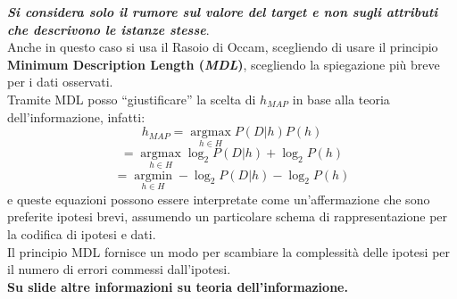 \documentclass[a4paper,12pt, oneside]{book}
\begin{document}
\textbf{\textit{Si considera solo il rumore sul valore del target e non sugli
    attributi che descrivono le istanze stesse}}.\\
Anche in questo caso si usa il Rasoio di Occam, scegliendo di usare il principio
\textbf{Minimum Description Length (\textit{MDL})}, scegliendo la spiegazione
più breve per i dati osservati.\\
Tramite MDL posso ``giustificare'' la scelta di $h_{MAP}$ in base alla teoria
dell'informazione, infatti:
\[h_{MAP}=\operatorname*{argmax}_{h\in H}P(D|h)P(h)\]
\[=\operatorname*{argmax}_{h\in H}\log_2P(D|h)+\log_2P(h)\]
\[=\operatorname*{argmin}_{h\in H}-\log_2P(D|h)-\log_2P(h)\]
e queste equazioni possono essere interpretate come un'affermazione che sono
preferite ipotesi brevi, assumendo un particolare schema di rappresentazione per
la codifica di ipotesi e dati.\\
Il principio MDL fornisce un modo per scambiare la complessità delle ipotesi
per il numero di errori commessi dall'ipotesi.\\

\textbf{Su slide altre informazioni su teoria dell'informazione.}
\end{document}
